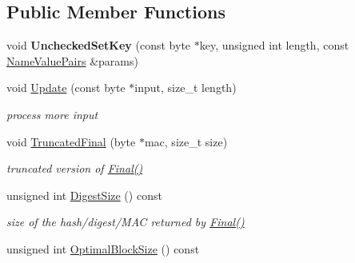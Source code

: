 \subsection*{Public Member Functions}
\begin{DoxyCompactItemize}
\item 
\hypertarget{class_c_m_a_c___base_ac5fe35fae612ea2266553e41dea0cb8c}{
void {\bfseries UncheckedSetKey} (const byte $\ast$key, unsigned int length, const \hyperlink{class_name_value_pairs}{NameValuePairs} \&params)}
\label{class_c_m_a_c___base_ac5fe35fae612ea2266553e41dea0cb8c}

\item 
\hypertarget{class_c_m_a_c___base_a582cd6d32b41c65d10481ebcd2c1aed4}{
void \hyperlink{class_c_m_a_c___base_a582cd6d32b41c65d10481ebcd2c1aed4}{Update} (const byte $\ast$input, size\_\-t length)}
\label{class_c_m_a_c___base_a582cd6d32b41c65d10481ebcd2c1aed4}

\begin{DoxyCompactList}\small\item\em process more input \item\end{DoxyCompactList}\item 
\hypertarget{class_c_m_a_c___base_a636b8a77c098bb08955ec8b4e66448a7}{
void \hyperlink{class_c_m_a_c___base_a636b8a77c098bb08955ec8b4e66448a7}{TruncatedFinal} (byte $\ast$mac, size\_\-t size)}
\label{class_c_m_a_c___base_a636b8a77c098bb08955ec8b4e66448a7}

\begin{DoxyCompactList}\small\item\em truncated version of \hyperlink{class_hash_transformation_aa0b8c7a110d8968268fd02ec32b9a8e8}{Final()} \item\end{DoxyCompactList}\item 
\hypertarget{class_c_m_a_c___base_ac504ce14e36c66a66a4b5d47629a70a3}{
unsigned int \hyperlink{class_c_m_a_c___base_ac504ce14e36c66a66a4b5d47629a70a3}{DigestSize} () const }
\label{class_c_m_a_c___base_ac504ce14e36c66a66a4b5d47629a70a3}

\begin{DoxyCompactList}\small\item\em size of the hash/digest/MAC returned by \hyperlink{class_hash_transformation_aa0b8c7a110d8968268fd02ec32b9a8e8}{Final()} \item\end{DoxyCompactList}\item 
\hypertarget{class_c_m_a_c___base_a6b024878c0ed378921919aa4696e6871}{
unsigned int \hyperlink{class_c_m_a_c___base_a6b024878c0ed378921919aa4696e6871}{OptimalBlockSize} () const }
\label{class_c_m_a_c___base_a6b024878c0ed378921919aa4696e6871}


\end{DoxyCompactItemize}
